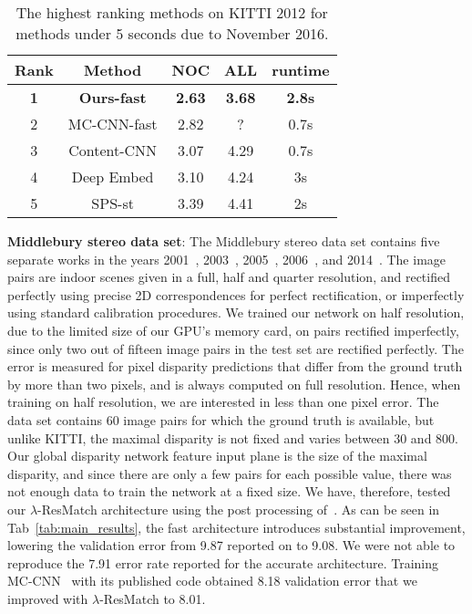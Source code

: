 \documentclass[10pt, twocolumn, letterpaper]{article}
\begin{document}
\begin{table}[t]
\begin{center}
\begin{tabular}{|c c c c c|}
\hline
Rank & Method & NOC & ALL & runtime  \\
\hline
\bf{1} & \bf{Ours-fast} &  \bf{2.63} & \bf{3.68} & \bf{2.8s} \\
2 & MC-CNN-fast\cite{newlecun} & 2.82 & ? & 0.7s \\
3 & Content-CNN\cite{efficient} &  3.07 & 4.29 & 0.7s \\
4 & Deep Embed\cite{deep_embed}  &  3.10 & 4.24 & 3s \\ 
5 & SPS-st\cite{Yamaguchi14}  &  3.39 & 4.41 & 2s \\ 
\hline
\end{tabular}
\end{center}
\caption{The highest ranking methods on KITTI 2012 for methods under 5 seconds due to November 2016.}
\label{tab:fast_kitti}
\end{table}


\textbf{Middlebury stereo data set}:
The Middlebury stereo data set contains five separate works in the years 2001~\cite{mb2002}, 2003~\cite{mb2003}, 2005~\cite{mbpal2007}, 2006~\cite{mb2007}, and 2014~\cite{mb2014}. The image pairs are indoor scenes given in a full, half and quarter resolution, and rectified perfectly using precise 2D correspondences for
perfect rectification, or imperfectly using standard calibration procedures. We trained our network on half resolution, due to the limited size of our GPU's memory card, on pairs rectified imperfectly, since only two out of fifteen image pairs in the test set are rectified perfectly. The error is measured for pixel disparity predictions that differ from the ground truth by more than two pixels, and is always computed on full resolution. Hence, when training on half resolution, we are interested in less than one pixel error.
The data set contains 60 image pairs for which the ground truth is available, but unlike KITTI, the maximal disparity is not fixed and varies between 30 and 800.
Our global disparity network feature input plane is the size of the maximal disparity, and since there are only a few pairs for each possible value, there was not enough data to train the network at a fixed size. We have, therefore, tested our $\lambda$-ResMatch architecture using the post processing of~\cite{newlecun}. As can be seen in Tab~\ref{tab:main_results}, the fast architecture introduces substantial improvement, lowering the validation error from 9.87 reported on \cite{newlecun} to 9.08. We were not able to reproduce the 7.91 error rate reported for the accurate architecture. Training MC-CNN~\cite{newlecun} with its published code obtained 8.18 validation error that we improved with $\lambda$-ResMatch to 8.01. 
\end{document}

